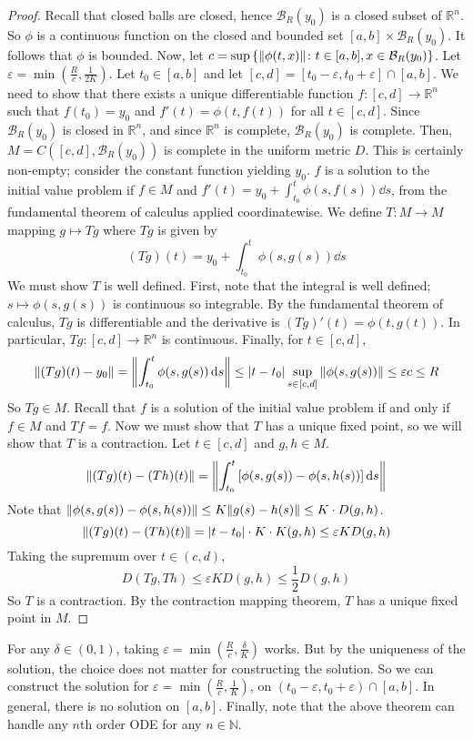 \begin{proof}
	Recall that closed balls are closed, hence \( \mathcal B_R(y_0) \) is a closed subset of \( \mathbb R^n \).
	So \( \phi \) is a continuous function on the closed and bounded set \( [a,b] \times \mathcal B_R(y_0) \).
	It follows that \( \phi \) is bounded.
	Now, let \( c = \sup \qty{ \norm{\phi(t,x)} \colon t \in [a,b], x \in \mathcal B_R(y_0) } \).
	Let \( \varepsilon = \min(\frac{R}{c}, \frac{1}{2K}) \).
	Let \( t_0 \in [a,b] \) and let \( [c,d] = [t_0 - \varepsilon, t_0 + \varepsilon] \cap [a,b] \).
	We need to show that there exists a unique differentiable function \( f \colon [c,d] \to \mathbb R^n \) such that \( f(t_0) = y_0 \) and \( f'(t) = \phi(t,f(t)) \) for all \( t \in [c,d] \).
	Since \( \mathcal B_R(y_0) \) is closed in \( \mathbb R^n \), and since \( \mathbb R^n \) is complete, \( \mathcal B_R(y_0) \) is complete.
	Then, \( M = C([c,d], \mathcal B_R(y_0)) \) is complete in the uniform metric \( D \).
	This is certainly non-empty; consider the constant function yielding \( y_0 \).
	\( f \) is a solution to the initial value problem if \( f \in M \) and \( f'(t) = y_0 + \int_{t_0}^t \phi(s, f(s)) \dd{s} \), from the fundamental theorem of calculus applied coordinatewise.
	We define \( T \colon M \to M \) mapping \( g \mapsto Tg \) where \( Tg \) is given by
	\[
		(Tg)(t) = y_0 + \int_{t_0}^t \phi(s, g(s)) \dd{s}
	\]
	We must show \( T \) is well defined.
	First, note that the integral is well defined; \( s \mapsto \phi(s,g(s)) \) is continuous so integrable.
	By the fundamental theorem of calculus, \( Tg \) is differentiable and the derivative is \( (Tg)'(t) = \phi(t,g(t)) \).
	In particular, \( Tg \colon [c,d] \to \mathbb R^n \) is continuous.
	Finally, for \( t \in [c,d] \),
	\[
		\norm{(Tg)(t) - y_0} = \norm{\int_{t_0}^t \phi(s, g(s)) \dd{s}} \leq \abs{t - t_0} \sup_{s \in [c,d]} \norm{\phi(s,g(s))} \leq \varepsilon c \leq R
	\]
	So \( Tg \in M \).
	Recall that \( f \) is a solution of the initial value problem if and only if \( f \in M \) and \( Tf = f \).
	Now we must show that \( T \) has a unique fixed point, so we will show that \( T \) is a contraction.
	Let \( t \in [c,d] \) and \( g,h \in M \).
	\[
		\norm{(Tg)(t) - (Th)(t)} = \norm{\int_{t_0}^t \qty[ \phi(s,g(s)) - \phi(s,h(s)) ] \dd{s}}
	\]
	Note that \( \norm{\phi(s,g(s)) - \phi(s,h(s))} \leq K \norm{g(s) - h(s)} \leq K \cdot D(g,h) \).
	\[
		\norm{(Tg)(t) - (Th)(t)} = \abs{t-t_0} \cdot K \cdot K(g,h) \leq \varepsilon K D(g,h)
	\]
	Taking the supremum over \( t \in (c,d) \),
	\[
		D(Tg, Th) \leq \varepsilon K D(g,h) \leq \frac{1}{2} D(g,h)
	\]
	So \( T \) is a contraction.
	By the contraction mapping theorem, \( T \) has a unique fixed point in \( M \).
\end{proof}
\begin{remark}
	For any \( \delta \in (0,1) \), taking \( \varepsilon = \min(\frac{R}{c}, \frac{\delta}{K}) \) works.
	But by the uniqueness of the solution, the choice does not matter for constructing the solution.
	So we can construct the solution for \( \varepsilon = \min(\frac{R}{c}, \frac{1}{K}) \), on \( (t_0 - \varepsilon, t_0 + \varepsilon) \cap [a,b] \).
	In general, there is no solution on \( [a,b] \).
	Finally, note that the above theorem can handle any \( n \)th order ODE for any \( n \in \mathbb N \).
\end{remark}
